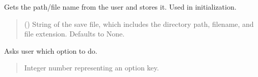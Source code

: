 \documentclass[letterpaper,10pt,english]{sphinxmanual}
\begin{document}
\begin{fulllineitems}
\begin{fulllineitems}
\label{\detokenize{Setup.SetupAllDevices:Setup.SetupAllDevices.Setup_PodDevices.SetupAll.SetupSaveFile}}
\pysigstartsignatures
{}
\pysigstopsignatures
\sphinxAtStartPar
Gets the path/file name from the user and stores it. Used in initialization.
\begin{quote}\begin{description}
\sphinxAtStartPar
{} (\sphinxstyleliteralemphasis{\sphinxupquote{{[}}}\sphinxstyleliteralemphasis{\sphinxupquote{,}}\sphinxstyleliteralemphasis{\sphinxupquote{|}}\sphinxstyleliteralemphasis{\sphinxupquote{{]} }}\sphinxstyleliteralemphasis{\sphinxupquote{| }}\sphinxstyleliteralemphasis{\sphinxupquote{, }}) \textendash{} String of the save file, which includes the directory path,                 filename, and file extension. Defaults to None.

\end{description}\end{quote}

\end{fulllineitems}


\begin{fulllineitems}
\label{\detokenize{Setup.SetupAllDevices:Setup.SetupAllDevices.Setup_PodDevices.SetupAll._AskOption}}
\pysigstartsignatures
{}
\pysigstopsignatures
\sphinxAtStartPar
Asks user which option to do.
\begin{quote}\begin{description}
\sphinxAtStartPar
Integer number representing an option key.


\end{description}
\end{quote}
\end{fulllineitems}
\end{fulllineitems}
\end{document}
